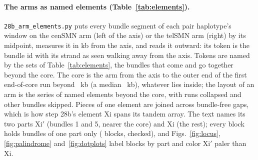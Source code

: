 \paragraph{The arms as named elements (Table~\ref{tab:elements}).} \texttt{28b\_arm\_elements.py} puts every bundle
segment of each pair haplotype's window on the cenSMN arm (left of the axis) or the telSMN arm (right) by its midpoint,
measures it in kb from the axis, and reads it outward: its token is the bundle id with its strand as seen walking away
from the axis. Tokens are named by the sets of Table~\ref{tab:elements}, the bundles that
come and go together beyond the core. The core is the arm from the axis to the outer end of the first
end-of-core run beyond \elAstart~kb (a median \elAEnd~kb), whatever lies inside; the layout of an arm is the series of named
elements beyond the core, with runs collapsed and other bundles skipped. Pieces of one element are joined across bundle-free
gaps, which is how step 28b's element Xi spans its tandem array. The text names its two parts Xi$'$ (bundles 1 and 5, nearer the core) and Xi (the rest); every block holds bundles of one part only (\xpBlocks{} blocks, checked), and Figs.~\ref{fig:locus}, \ref{fig:palindrome} and~\ref{fig:dotplots} label blocks by part and color Xi$'$ paler than Xi.
